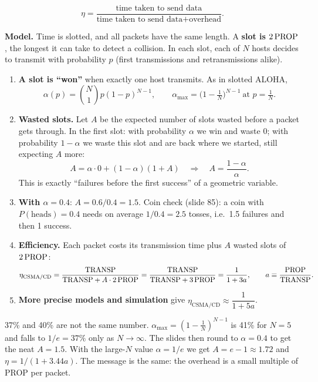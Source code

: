 \begin{defn}
\[ \eta=\frac{\text{time taken to send data}}{\text{time taken to send data}+\text{overhead}}. \]
\end{defn}

\textbf{Model.} Time is slotted, and all packets have the same length. A \textbf{slot is $2\,\text{PROP}$}, the longest it can take to detect a collision.
In each slot, each of $N$ hosts decides to transmit with probability $p$ (first transmissions and retransmissions alike).

\begin{enumerate}
  \item \textbf{A slot is ``won''} when exactly one host transmits. As in slotted ALOHA,
        \[ \alpha(p)=\binom N1p(1-p)^{N-1}, \qquad \alpha_{\max}=\Big(1-\tfrac1N\Big)^{N-1}\ \text{at } p=\tfrac1N. \]
  \item \textbf{Wasted slots.} Let $A$ be the expected number of slots wasted before a packet gets through. In the first slot: with probability $\alpha$ we win and waste $0$;
        with probability $1-\alpha$ we waste this slot and are back where we started, still expecting $A$ more:
        \[ A=\alpha\cdot0+(1-\alpha)(1+A)\quad\Rightarrow\quad A=\frac{1-\alpha}{\alpha}. \]
        This is exactly ``failures before the first success'' of a geometric variable.
  \item \textbf{With $\alpha=0.4$}: $A=0.6/0.4=1.5$. Coin check (slide 85): a coin with $P(\text{heads})=0.4$ needs on average $1/0.4=2.5$ tosses, i.e.\ 1.5 failures and then 1 success.
  \item \textbf{Efficiency.} Each packet costs its transmission time plus $A$ wasted slots of $2\,\text{PROP}$:
        \[ \eta_{\text{CSMA/CD}}=\frac{\text{TRANSP}}{\text{TRANSP}+A\cdot2\,\text{PROP}}=\frac{\text{TRANSP}}{\text{TRANSP}+3\,\text{PROP}}=\frac{1}{1+3a},\qquad a\equiv\frac{\text{PROP}}{\text{TRANSP}}. \]
  \item \textbf{More precise models and simulation} give $\eta_{\text{CSMA/CD}}\approx\dfrac{1}{1+5a}$.
\end{enumerate}

\begin{pitfall}
37\% and 40\% are not the same number. $\alpha_{\max}=(1-\frac1N)^{N-1}$ is 41\% for $N=5$ and falls to $1/e=37\%$ only as $N\to\infty$. The slides then round to $\alpha=0.4$ to get the neat $A=1.5$.
With the large-$N$ value $\alpha=1/e$ we get $A=e-1\approx1.72$ and $\eta=1/(1+3.44a)$. The message is the same: the overhead is a small multiple of PROP per packet.
\end{pitfall}

